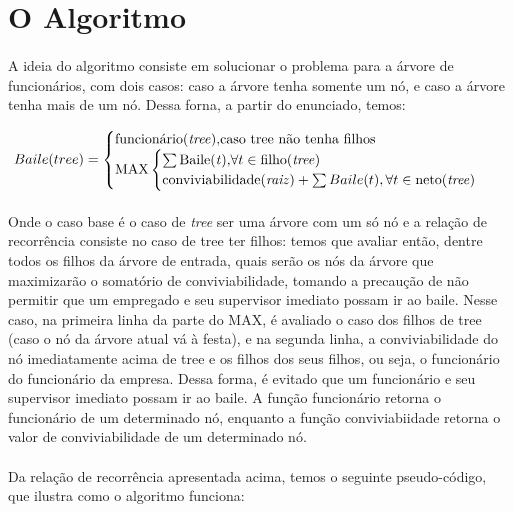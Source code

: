 \documentclass[a4paper]{article}
\begin{document}
\section{O Algoritmo}
\paragraph{} A ideia do algoritmo consiste em solucionar o problema para a árvore de funcionários, com dois casos: caso a árvore tenha somente um nó, e caso a árvore tenha mais de um nó. Dessa forna, a partir do enunciado, temos:


\begin{equation}
	Baile(tree) = \begin{cases}
		\text{funcionário(\textit{tree}),}  \text{caso tree não tenha filhos}\\
		\text{MAX}  \begin{cases}
			\sum \text{Baile(\textit{t}),}  \forall t \in \text{filho(\textit{tree})}\\
			\text{conviviabilidade(\textit{raiz})} + \sum  Baile(t), \forall t \in \text{neto(\textit{tree})}
			\end{cases}
		\end{cases}
\end{equation}
\paragraph{}Onde o caso base é o caso de \textit{tree} ser uma árvore com um só nó e a relação de recorrência consiste no caso de tree ter filhos: temos que avaliar então, dentre todos os filhos da árvore de entrada, quais serão os nós da árvore que maximizarão o somatório de conviviabilidade, tomando a precaução de não permitir que um empregado e seu supervisor imediato possam ir ao baile. Nesse caso, na primeira linha da parte do MAX, é avaliado o caso dos filhos de tree (caso o nó da árvore atual vá à festa), e na segunda linha, a conviviabilidade do nó imediatamente acima de tree e os filhos dos seus filhos, ou seja, o funcionário do funcionário da empresa. Dessa forma, é evitado que um funcionário e seu supervisor imediato possam ir ao baile. A função funcionário retorna o funcionário de um determinado nó, enquanto a função conviviabiidade retorna o valor de conviviabilidade de um determinado nó.\\

\paragraph{}Da relação de recorrência apresentada acima, temos o seguinte pseudo-código, que ilustra como o algoritmo funciona:
\end{document}
